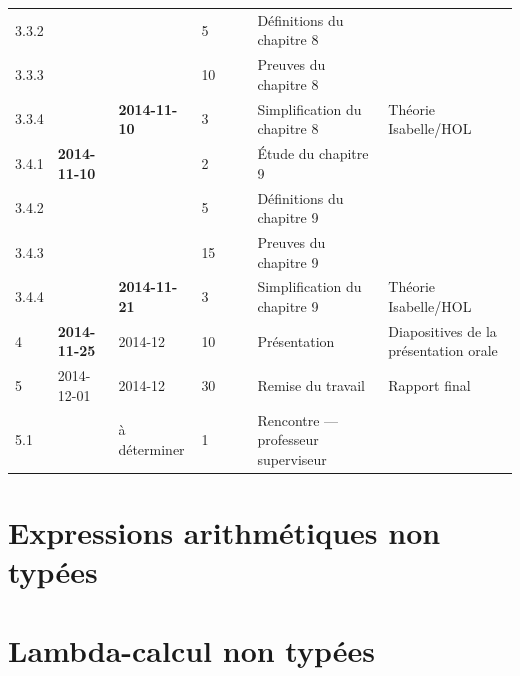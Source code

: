 \documentclass[a4paper, oneside, 12pt, titlepage]{article}
\begin{document}
\begin{appendices}
\begin{landscape}
\begin{table}[!h]
\begin{tabular}{|l||l|l|p{1.6cm}|p{1.6cm}|c||l|p{5cm}|}
    3.3.2 &                     &                     & 5  &   &            & Définitions du chapitre 8 & \\
    3.3.3 &                     &                     & 10 &   &            & Preuves du chapitre 8 & \\
    3.3.4 &                     & \textbf{2014-11-10} & 3  &   &            & Simplification du chapitre 8 & Théorie Isabelle/HOL \\
    \hline
    3.4.1 & \textbf{2014-11-10} &                     & 2  & & & Étude du chapitre 9 & \\
    3.4.2 &                     &                     & 5  & & & Définitions du chapitre 9 & \\
    3.4.3 &                     &                     & 15 & & & Preuves du chapitre 9 & \\
    3.4.4 &                     & \textbf{2014-11-21} & 3  & & & Simplification du chapitre 9 & Théorie Isabelle/HOL \\
    \hline
    4 & \textbf{2014-11-25} & 2014-12 & 10 & & & Présentation & Diapositives de la présentation orale \\
    \hline
    5   & 2014-12-01 & 2014-12      & 30 & & & Remise du travail & Rapport final \\
    5.1 &            & à déterminer & 1  & & & Rencontre --- professeur superviseur & \\
    \hline
  \end{tabular}
\end{table}

\end{landscape}
\restoregeometry

\section{Expressions arithmétiques non typées}
\label{app:untyped-arith-expr}


\section{Lambda-calcul non typées}
\label{app:untyped-lambda-calculus}


\end{appendices}
\end{document}

